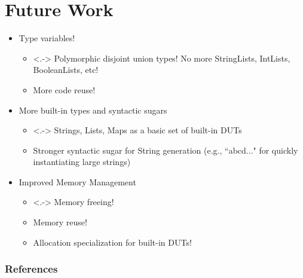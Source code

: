 \documentclass{beamer}
\begin{document}
\section{Future Work}

\begin{frame}

\begin{itemize}
 \item<1-> Type variables!
 \begin{itemize}
  \item<.-> Polymorphic disjoint union types! No more StringLists, IntLists, BooleanLists, etc!
  \item More code reuse!
 \end{itemize}
 
 \item<2-> More built-in types and syntactic sugars
 \begin{itemize}
 \item<.-> Strings, Lists, Maps as a basic set of built-in DUTs
 \item Stronger syntactic sugar for String generation (e.g., ``abcd..." for quickly instantiating large strings)
 \end{itemize}
 
 \item<3-> Improved Memory Management
 \begin{itemize}
  \item<.-> Memory freeing!
  \item Memory reuse!
  \item Allocation specialization for built-in DUTs!
 \end{itemize}

\end{itemize}

\end{frame}

\begin{frame}
\frametitle{References}
\end{frame}
\end{document}
